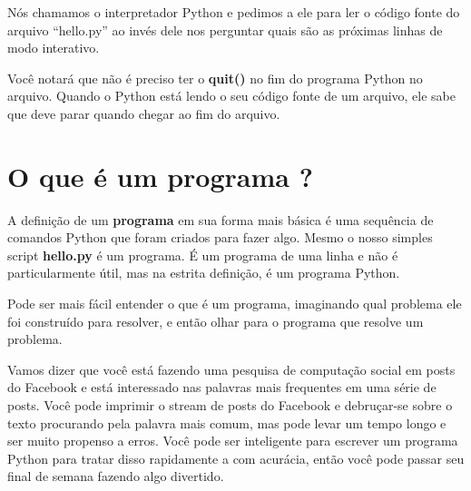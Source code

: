 Nós chamamos o interpretador Python e pedimos a ele para ler o código fonte do
arquivo ``hello.py'' ao invés dele nos perguntar quais são as próximas linhas
de modo interativo.
%

Você notará que não é preciso ter o {\bf quit()} no fim do programa Python
no arquivo. Quando o Python está lendo o seu código fonte de um arquivo,
ele sabe que deve parar quando chegar ao fim do arquivo.
%

\section{O que é um programa ?}
%

A definição de um {\bf programa} em sua forma mais básica é uma sequência
de comandos Python que foram criados para fazer algo.
Mesmo o nosso simples script {\bf hello.py} é um programa. É um programa
de uma linha e não é particularmente útil, mas na estrita definição, é
um programa Python.
%

Pode ser mais fácil entender o que é um programa, imaginando qual problema ele
foi construído para resolver, e então olhar para o programa que resolve um
problema.
%

Vamos dizer que você está fazendo uma pesquisa de computação social em posts
do Facebook e está interessado nas palavras mais frequentes em uma série de posts.
Você pode imprimir o stream de posts do Facebook e debruçar-se sobre o texto
procurando pela palavra mais comum, mas pode levar um tempo longo e ser muito
propenso a erros. Você pode ser inteligente para escrever um programa Python para
tratar disso rapidamente a com acurácia, então você pode passar seu final de semana
fazendo algo divertido.
%

